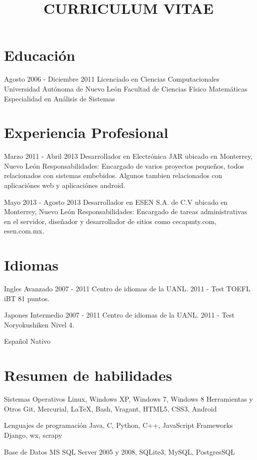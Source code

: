 \documentclass[10pt,a4paper]{moderncv}
\title{CURRICULUM VITAE{}}
\begin{document}
\maketitle

\section{Educación}
  \cventry
    {Agosto 2006 - Diciembre 2011}
    {Licenciado en Ciencias Computacionales}
    {Universidad Autónoma de Nuevo León}
    {Facultad de Ciencias Físico Matemáticas}
    {Especialidad en Análisis de Sistemas}
    {}

\section{Experiencia Profesional}
  \cventry
  {Marzo 2011 - Abril 2013}
  {Desarrollador}
  {en Electrónica JAR}
  {ubicado en Monterrey, Nuevo León}
  {}
  {Responsabilidades: Encargado de varios proyectos pequeños, todos relacionados con sistemas embebidos. Algunos tambien relacionados con aplicaciónes web y aplicaciónes android.}

  \cventry
    {Mayo 2013 - Agosto 2013}
    {Desarrollador}
    {en ESEN S.A. de C.V}
    {ubicado en Monterrey, Nuevo León}
    {}
    {Responsabilidades: Encargado de tareas administrativas en el servidor, diseñador y desarrollador de sitios como cecapmty.com, esen.com.mx.}

\section{Idiomas}
  \cvlanguage
    {Ingles}
    {Avanzado}
    {2007 - 2011 Centro de idiomas de la UANL. 2011 - Test TOEFL iBT 81 puntos.}

  \cvlanguage
    {Japones}
    {Intermedio}
    {2007 - 2011 Centro de idiomas de la UANL. 2011 - Test Noryokushiken Nivel 4.}

  \cvlanguage
    {Español}
    {Nativo}
    {}

\section{Resumen de habilidades}
  \cvcomputer
    {Sistemas Operativos}
      {Linux, Windows XP, Windows 7, Windows 8}
    {Herramientas y Otros}
      {Git, Mercurial, \LaTeX, Bash, Vragant, HTML5, CSS3, Android}

  \cvcomputer
    {Lenguajes de programación}
      {Java, C, Python, C++, JavaScript}
    {Frameworks}
      {Django, wx, scrapy}

  \cvcomputer
    {Base de Datos}
      {MS SQL Server 2005 y 2008, SQLite3, MySQL, PostgresSQL}
    {}
      {}
\end{document}
